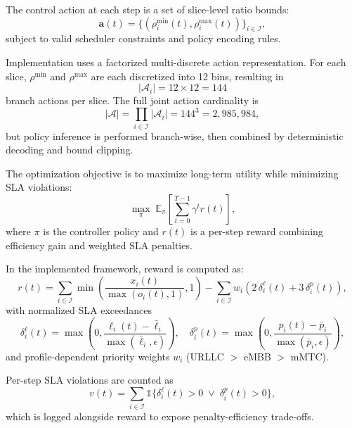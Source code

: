 \documentclass[journal]{IEEEtran}
\begin{document}
The control action at each step is a set of slice-level ratio bounds:
\begin{equation}
\mathbf{a}(t)=\{(\rho^{\min}_i(t),\rho^{\max}_i(t))\}_{i\in\mathcal{I}},
\end{equation}
subject to valid scheduler constraints and policy encoding rules.

Implementation uses a factorized multi-discrete action representation. For each slice, \(\rho^{\min}\) and \(\rho^{\max}\) are each discretized into 12 bins, resulting in
\begin{equation}
|\mathcal{A}_i|=12\times 12=144
\end{equation}
branch actions per slice. The full joint action cardinality is
\begin{equation}
|\mathcal{A}|=\prod_{i\in\mathcal{I}}|\mathcal{A}_i|=144^3=2{,}985{,}984,
\end{equation}
but policy inference is performed branch-wise, then combined by deterministic decoding and bound clipping.

The optimization objective is to maximize long-term utility while minimizing SLA violations:
\begin{equation}
\max_{\pi}\; \mathbb{E}_{\pi}\left[\sum_{t=0}^{T-1} \gamma^t r(t)\right],
\end{equation}
where $\pi$ is the controller policy and $r(t)$ is a per-step reward combining efficiency gain and weighted SLA penalties.

In the implemented framework, reward is computed as:
\begin{equation}
 r(t)=\sum_{i\in\mathcal{I}}\min\left(\frac{x_i(t)}{\max(o_i(t),1)},1\right)
 -\sum_{i\in\mathcal{I}} w_i\left(2\,\delta^{\ell}_i(t)+3\,\delta^{p}_i(t)\right),
\end{equation}
with normalized SLA exceedances
\begin{equation}
\delta^{\ell}_i(t)=\max\left(0,\frac{\ell_i(t)-\bar{\ell}_i}{\max(\bar{\ell}_i,\epsilon)}\right), \quad
\delta^{p}_i(t)=\max\left(0,\frac{p_i(t)-\bar{p}_i}{\max(\bar{p}_i,\epsilon)}\right),
\end{equation}
and profile-dependent priority weights $w_i$ (URLLC $>$ eMBB $>$ mMTC).

Per-step SLA violations are counted as
\begin{equation}
v(t)=\sum_{i\in\mathcal{I}}\mathbb{1}\{\delta^{\ell}_i(t)>0\;\vee\;\delta^{p}_i(t)>0\},
\end{equation}
which is logged alongside reward to expose penalty-efficiency trade-offs.
\end{document}

